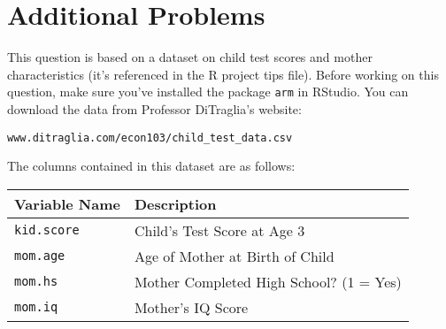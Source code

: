 \documentclass[addpoints,12pt]{exam}\usepackage[]{graphicx}\usepackage[]{color}
\begin{document}
  
  \section*{Additional Problems}
  \begin{questions}
  
  \question This question is based on a dataset on child test scores and mother characteristics (it's referenced in the R project tips file). Before working on this question, make sure you've installed the package \texttt{arm} in RStudio. You can download the data from Professor DiTraglia's website: \begin{verbatim}www.ditraglia.com/econ103/child_test_data.csv\end{verbatim}
  The columns contained in this dataset are as follows:
  \begin{table}[h]
  \centering
  \begin{tabular}{ll}
  Variable Name & Description\\
  \hline
  \texttt{kid.score}& Child's Test Score at Age 3\\
  \texttt{mom.age}&Age of Mother at Birth of Child\\
  \texttt{mom.hs}& Mother Completed High School? (1 = Yes)\\
  \texttt{mom.iq}& Mother's IQ Score
  \end{tabular}
  \end{table}
  \begin{parts}

\end{parts}
\end{questions}
\end{document}
